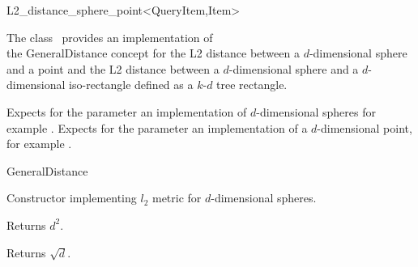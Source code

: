 

\begin{ccRefClass}{L2_distance_sphere_point<QueryItem,Item>}  %

\ccDefinition

The class \ccRefName\ provides an implementation of \\
the GeneralDistance concept
for the L2 distance between a $d$-dimensional sphere and a point and the L2 distance between a $d$-dimensional sphere
and a $d$-dimensional iso-rectangle defined as a $k$-$d$ tree rectangle.


\ccParameters

Expects for the parameter 
 an implementation of $d$-dimensional spheres
for example .
Expects for the parameter  an implementation
of a $d$-dimensional point, for example .

\ccIsModel

GeneralDistance

\ccTypes


\ccCreation
{}  %


{Constructor implementing $l_2$ metric for
$d$-dimensional spheres.}


 {Returns $d^2$.}

 {Returns $\sqrt d$.}



\end{ccRefClass}
